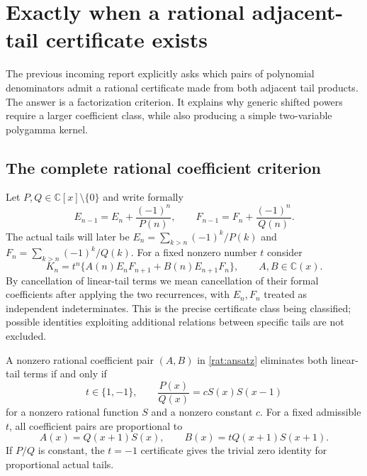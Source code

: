 \section{Exactly when a rational adjacent-tail certificate exists}
\label{rat:section}

The previous incoming report explicitly asks which pairs of polynomial
denominators admit a rational certificate made from both adjacent
tail products. The answer is a factorization criterion. It explains
why generic shifted powers require a larger coefficient class, while
also producing a simple two-variable polygamma kernel.

\subsection{The complete rational coefficient criterion}

Let $P,Q\in\mathbb C[x]\setminus\{0\}$ and write formally
\[
 E_{n-1}=E_n+\frac{(-1)^n}{P(n)},\qquad
 F_{n-1}=F_n+\frac{(-1)^n}{Q(n)}.
\]
The actual tails will later be $E_n=\sum_{k>n}(-1)^k/P(k)$ and
$F_n=\sum_{k>n}(-1)^k/Q(k)$. For a fixed nonzero number $t$ consider
\begin{equation}\label{rat:ansatz}
 K_n=t^n\{A(n)E_nF_{n+1}+B(n)E_{n+1}F_n\},\qquad
 A,B\in\mathbb C(x).
\end{equation}
By cancellation of linear-tail terms we mean cancellation of their
formal coefficients after applying the two recurrences, with $E_n,F_n$
treated as independent indeterminates. This is the precise certificate
class being classified; possible identities exploiting additional
relations between specific tails are not excluded.

\begin{theorem}\label{rat:classification}
A nonzero rational coefficient pair $(A,B)$ in \eqref{rat:ansatz}
eliminates both linear-tail terms if and only if
\begin{equation}\label{rat:factorization}
 t\in\{1,-1\},\qquad
 \frac{P(x)}{Q(x)}=cS(x)S(x-1)
\end{equation}
for a nonzero rational function $S$ and a nonzero constant $c$.
For a fixed admissible $t$, all coefficient pairs are proportional to
\begin{equation}\label{rat:coefficients}
 A(x)=Q(x+1)S(x),\qquad B(x)=tQ(x+1)S(x+1).
\end{equation}
If $P/Q$ is constant, the $t=-1$ certificate gives the trivial zero
identity for proportional actual tails.
\end{theorem}

